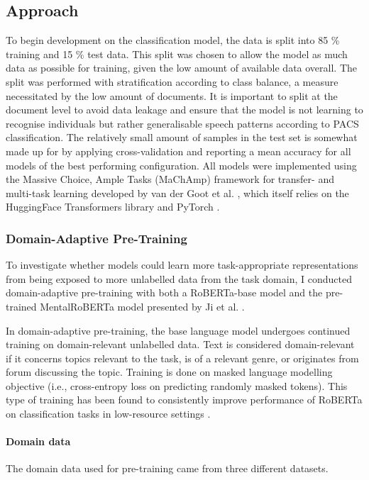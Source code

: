 \documentclass[12pt]{report}
\begin{document}
\subsection{Approach}
To begin development on the classification model, the data is split into 85 \% training and 15 \% test data.
This split was chosen to allow the model as much data as possible for training, given the low amount of available data overall.
The split was performed with stratification according to class balance, a measure necessitated by the low amount of documents.
It is important to split at the document level to avoid data leakage and ensure that the model is not learning to recognise individuals but rather generalisable speech patterns according to PACS classification.
The relatively small amount of samples in the test set is somewhat made up for by applying cross-validation and reporting a mean accuracy for all models of the best performing configuration.
All models were implemented using the Massive Choice, Ample Tasks (MaChAmp) framework for transfer- and multi-task learning developed by van der Goot et al. \citeyear{MaChAmp}, which itself relies on the HuggingFace Transformers library \cite{HuggingFace} and PyTorch \cite{PyTorch}.

\subsubsection{Domain-Adaptive Pre-Training}
To investigate whether models could learn more task-appropriate representations from being exposed to more unlabelled data from the task domain, I conducted domain-adaptive pre-training with both a RoBERTa-base model \cite{roberta} and the pre-trained MentalRoBERTa model presented by Ji et al. \citeyear{MentalBERT}.

In domain-adaptive pre-training, the base language model undergoes continued training on domain-relevant unlabelled data.
Text is considered domain-relevant if it concerns topics relevant to the task, is of a relevant genre, or originates from forum discussing the topic.
Training is done on masked language modelling objective (i.e., cross-entropy loss on predicting randomly masked tokens).
This type of training has been found to consistently improve performance of RoBERTa on classification tasks in low-resource settings \cite{Gururangan2020}.

\paragraph*{Domain data}
The domain data used for pre-training came from three different datasets.
\end{document}
